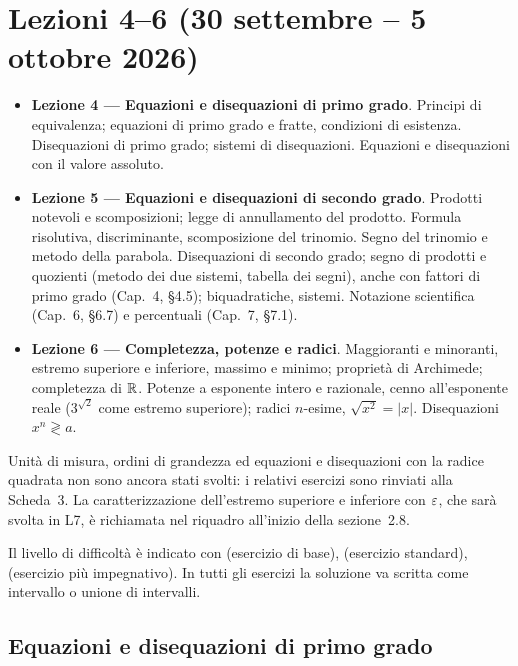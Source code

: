 \chapter{Lezioni 4--6 (30 settembre -- 5 ottobre 2026)}

\begin{vuoto}{}
\begin{itemize}
\item[\bul] \textbf{Lezione 4 --- Equazioni e disequazioni di primo grado}. Principi di equivalenza; equazioni di primo grado e fratte, condizioni di esistenza. Disequazioni di primo grado; sistemi di disequazioni. Equazioni e disequazioni con il valore assoluto.
\item[\bul] \textbf{Lezione 5 --- Equazioni e disequazioni di secondo grado}. Prodotti notevoli e scomposizioni; legge di annullamento del prodotto. Formula risolutiva, discriminante, scomposizione del trinomio. Segno del trinomio e metodo della parabola. Disequazioni di secondo grado; segno di prodotti e quozienti (metodo dei due sistemi, tabella dei segni), anche con fattori di primo grado (Cap.~4, \S4.5); biquadratiche, sistemi. Notazione scientifica (Cap.~6, \S6.7) e percentuali (Cap.~7, \S7.1).
\item[\bul] \textbf{Lezione 6 --- Completezza, potenze e radici}. Maggioranti e minoranti, estremo superiore e inferiore, massimo e minimo; proprietà di Archimede; completezza di $\mathbb R$. Potenze a esponente intero e razionale, cenno all'esponente reale ($3^{\sqrt2}$ come estremo superiore); radici $n$-esime, $\sqrt{x^2}=|x|$. Disequazioni $x^n\gtrless a$.
\end{itemize}
\end{vuoto}

Unità di misura, ordini di grandezza ed equazioni e disequazioni con la radice quadrata non sono ancora stati svolti: i relativi esercizi sono rinviati alla Scheda~3. La caratterizzazione dell'estremo superiore e inferiore con $\varepsilon$, che sarà svolta in L7, è richiamata nel riquadro all'inizio della sezione~2.8.

Il livello di difficoltà è indicato con  (esercizio di base),  (esercizio standard),  (esercizio più impegnativo). In tutti gli esercizi la soluzione va scritta come intervallo o unione di intervalli.

\section{Equazioni e disequazioni di primo grado}

